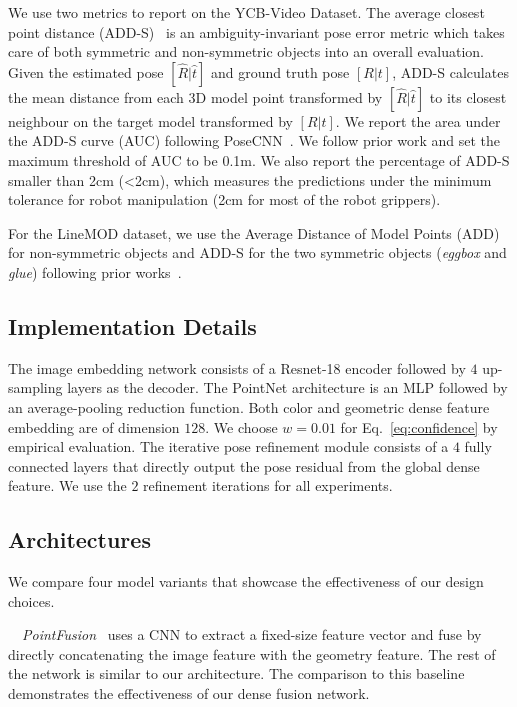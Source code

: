 \documentclass[10pt,twocolumn,letterpaper]{article}
\begin{document}
We use two metrics to report on the YCB-Video Dataset. The average closest point distance (ADD-S)~\cite{xiang2017posecnn} is an ambiguity-invariant pose error metric which takes care of both symmetric and non-symmetric objects into an overall evaluation. Given the estimated pose $[\hat{R}|\hat{t}]$ and ground truth pose $[R|t]$, ADD-S calculates the mean distance from each 3D model point transformed by $[\hat{R}|\hat{t}]$ to its closest neighbour on the target model transformed by $[R|t]$. We report the area under the ADD-S curve (AUC) following PoseCNN~\cite{xiang2017posecnn}. We follow prior work and set the maximum threshold of AUC to be 0.1m. We also report the percentage of ADD-S smaller than 2cm (\textless{}2cm), which measures the predictions under the minimum tolerance for robot manipulation (2cm for most of the robot grippers).

For the LineMOD dataset, we use the Average Distance of Model Points (ADD)~\cite{hinterstoisser2012model} for non-symmetric objects and ADD-S for the two symmetric objects (\textit{eggbox} and \textit{glue}) following prior works~\cite{hinterstoisser2012model,sundermeyer2018implicit,tekin18}.

\subsection{Implementation Details}
\label{ssec::implementation}
The image embedding network consists of a Resnet-18 encoder followed by $4$ up-sampling layers as the decoder. The PointNet architecture is an MLP followed by an average-pooling reduction function. Both color and geometric dense feature embedding are of dimension $128$. We choose $w = 0.01$ for Eq.~\ref{eq:confidence} by empirical evaluation. The iterative pose refinement module consists of a $4$ fully connected layers that directly output the pose residual from the global dense feature. We use the $2$ refinement iterations for all experiments.

\subsection{Architectures}
We compare four model variants that showcase the effectiveness of our design choices.

\noindent~\textbullet~\textit{PointFusion}~\cite{xu2017pointfusion} uses a CNN to extract a fixed-size feature vector and fuse by directly concatenating the image feature with the geometry feature. The rest of the network is similar to our architecture. The comparison to this baseline demonstrates the effectiveness of our dense fusion network.
\end{document}
